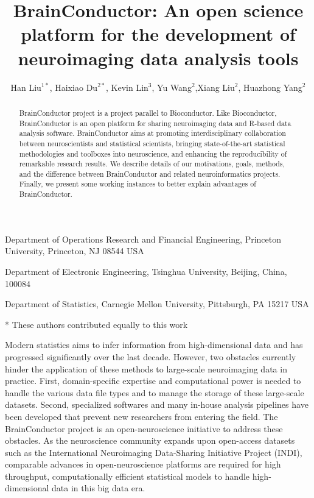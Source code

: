 \documentclass{nature}
\title{BrainConductor: An open science platform for the development of neuroimaging
data analysis tools}
\author{Han Liu$^{1*}$, Haixiao Du$^{2*}$, Kevin Lin$^3$, Yu Wang$^2$,Xiang Liu$^2$, Huazhong
Yang$^2$ {\color{red}}}
\begin{document}
\maketitle



\begin{affiliations}
\item Department of Operations Research and Financial Engineering, Princeton
University, Princeton, NJ 08544 USA
\item Department of Electronic Engineering, Tsinghua University, Beijing, China,
100084
\item Department of Statistics, Carnegie Mellon University,
Pittsburgh, PA 15217 USA
\item[*] These authors contributed equally to this work
\end{affiliations}

\begin{abstract}
    BrainConductor project is a project parallel to Bioconductor. Like
Bioconductor, BrainConductor is an open platform for sharing neuroimaging data
and R-based data analysis software. BrainConductor aims at promoting
interdisciplinary collaboration between neuroscientists and
statistical scientists, bringing state-of-the-art statistical methodologies and
toolboxes into neuroscience, and enhancing the reproducibility of remarkable
research results. We describe details of our motivations, goals, methods, and
the difference between BrainConductor and related neuroinformatics projects.
Finally, we present some working instances to better explain advantages of
BrainConductor.
\end{abstract}


Modern statistics aims to infer information from high-dimensional data
and has progressed significantly over the last decade.
However, two obstacles currently hinder the
application of these methods to large-scale neuroimaging data 
in practice. 
First, domain-specific expertise and computational power is needed to handle
the various data file types and to manage the storage
of these large-scale datasets. Second, specialized softwares and
many in-house analysis pipelines have been developed that 
prevent new researchers from entering the field.
The BrainConductor project is an open-neuroscience
initiative to address
these obstacles.
As the neuroscience community expands upon open-access
datasets such as the  International Neuroimaging Data-Sharing
Initiative Project (INDI), comparable advances in 
open-neuroscience platforms are required
for high
throughput, computationally efficient statistical models
to handle high-dimensional data in this big data era. 
\end{document}
